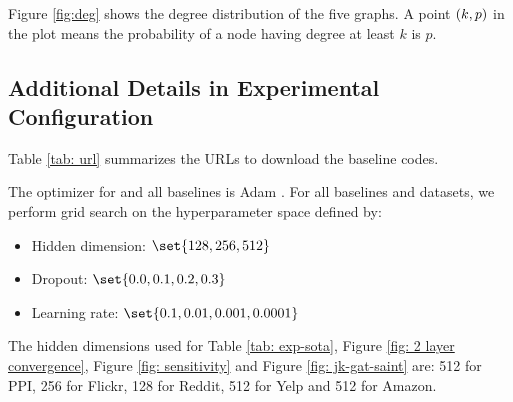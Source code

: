 Figure \ref{fig:deg} shows the degree distribution of the five graphs. 
A point $\left( k,p \right)$ in the plot means the probability of a node having degree at least $k$ is $p$. 

\subsection{Additional Details in Experimental Configuration}
\label{appendix: config}

\begin{table}[!ht]
\caption{URLs and commit number to run baseline codes}
    \centering
    \label{tab: url}
\end{table}


Table \ref{tab: url} summarizes the URLs to download the baseline codes. 




The optimizer for {\graphsaint} and all baselines is Adam \citep{adam}. 
For all baselines and datasets, we perform grid search on the hyperparameter space defined by:
\begin{itemize}
    \item Hidden dimension: $\set{128,256,512}$
    \item Dropout: $\set{0.0,0.1,0.2,0.3}$
    \item Learning rate: $\set{0.1,0.01,0.001,0.0001}$
\end{itemize}
The hidden dimensions used for Table \ref{tab: exp-sota}, Figure \ref{fig: 2 layer convergence}, Figure \ref{fig: sensitivity} and Figure \ref{fig: jk-gat-saint} are: 512 for PPI, 256 for Flickr, 128 for Reddit, 512 for Yelp and 512 for Amazon. 

